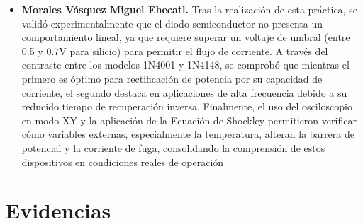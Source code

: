 \documentclass[journal]{IEEEtran}
\begin{document}
\begin{itemize}
    \item \textbf{Morales Vásquez Miguel Ehecatl.} 
    \newline Tras la realización de esta práctica, se validó experimentalmente que el diodo semiconductor no presenta un comportamiento lineal, ya que requiere superar un voltaje de umbral (entre 0.5 y 0.7V para silicio) para permitir el flujo de corriente. 
    A través del contraste entre los modelos 1N4001 y 1N4148, se comprobó que mientras el primero es óptimo para rectificación de potencia por su capacidad de corriente, el segundo destaca en aplicaciones de alta frecuencia debido a su reducido tiempo de recuperación inversa. 
    Finalmente, el uso del osciloscopio en modo XY y la aplicación de la Ecuación de Shockley permitieron verificar cómo variables externas, especialmente la temperatura, alteran la barrera de potencial y la corriente de fuga, consolidando la comprensión de estos dispositivos en condiciones reales de operación

\end{itemize}




%


\appendices
\section{Evidencias}
\end{document}
